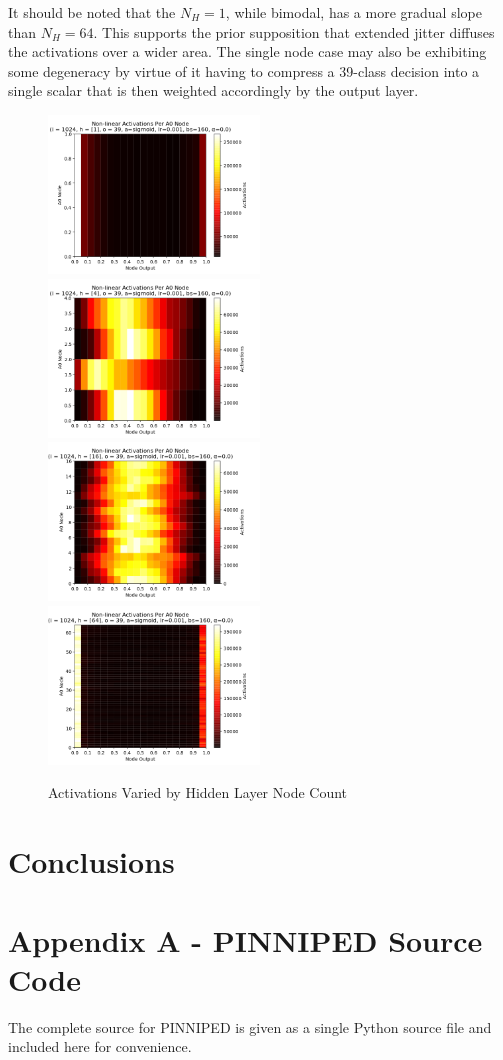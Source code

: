 \documentclass[10pt,epsf]{article}
\begin{document}
{{{      It should be noted that the $N_H = 1$, while bimodal, has a more gradual slope than $N_H = 64$.
      This supports the prior supposition that extended jitter diffuses the activations over a wider
      area. The single node case may also be exhibiting some degeneracy by virtue of it having to compress
      a 39-class decision into a single scalar that is then weighted accordingly by the output layer.
    }
    \begin{figure}[h]
      \includegraphics[width=0.5\textwidth]{./img/1-0.001-160-0-sigmoid-1/activations-A0-255.png}
      \includegraphics[width=0.5\textwidth]{./img/4-0.001-160-0-sigmoid-1/activations-A0-255.png}
      \includegraphics[width=0.5\textwidth]{./img/16-0.001-160-0-sigmoid-1/activations-A0-255.png}
      \includegraphics[width=0.5\textwidth]{./img/64-0.001-160-0-sigmoid-1/activations-A0-255.png}
      \caption{Activations Varied by Hidden Layer Node Count}
      \label{fig:a-by-nh}
    \end{figure}
  }
}
\section{Conclusions}{
}

\printbibliography
\section{Appendix A - PINNIPED Source Code}{
  The complete source for PINNIPED is given as a single Python source file and included here
  for convenience.
  {\scriptsize\inputminted{python}{./pinniped.py}}
}
\end{document}

